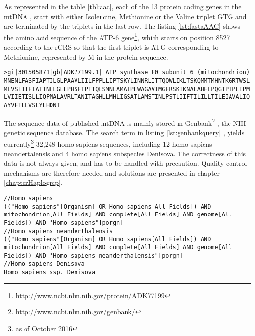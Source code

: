As represented in the table \ref{tbl:aac}, each of the 13 protein coding genes in the mtDNA \cite{Bandelt2006}, start with either Isoleucine, Methionine or the Valine triplet GTG and are terminated by the triplets in the last row. The listing \ref{lst:fastaAAC} shows the amino acid sequence of the ATP-6 gene\footnote{\url{http://www.ncbi.nlm.nih.gov/protein/ADK77199}}, which starts on position 8527 according to the rCRS so that the first triplet is ATG corresponding to Methionine, represented by M in the protein sequence.
{\small 
\begin{lstlisting}[caption= {Example of a FASTA protein sequence - here the complete ATP-6 gene}, label={lst:fastaAAC}]
>gi|301505871|gb|ADK77199.1| ATP synthase F0 subunit 6 (mitochondrion)
MNENLFASFIAPTILGLPAAVLIILFPPLLIPTSKYLINNRLITTQQWLIKLTSKQMMTMHNTKGRTWSL
MLVSLIIFIATTNLLGLLPHSFTPTTQLSMNLAMAIPLWAGAVIMGFRSKIKNALAHFLPQGTPTPLIPM
LVIIETISLLIQPMALAVRLTANITAGHLLMHLIGSATLAMSTINLPSTLIIFTILILLTILEIAVALIQ
AYVFTLLVSLYLHDNT
\end{lstlisting}
}
The sequence data of published mtDNA is mainly stored in Genbank\footnote{\url{http://www.ncbi.nlm.nih.gov/genbank/}} \cite{Benson2005}, the NIH genetic sequence database. The search term in listing \ref{lst:genbankquery} , yields currently\footnote{as of October 2016} 32,248 homo sapiens sequences, including 12 homo sapiens neandertalensis and 4 homo sapiens subspecies Denisova. 
The correctness of this data is not always given, and has to be handled with precaution. Quality control mechanisms are therefore needed and solutions are presented in chapter \ref{chapterHaplogrep}. 
\begin{lstlisting}[caption={GenBank queries for mtDNA sequences}, label={lst:genbankquery}]
//Homo sapiens
(("Homo sapiens"[Organism] OR Homo sapiens[All Fields]) AND mitochondrion[All Fields] AND complete[All Fields] AND genome[All Fields]) AND "Homo sapiens"[porgn]
//Homo sapiens neanderthalensis
(("Homo sapiens"[Organism] OR Homo sapiens[All Fields]) AND mitochondrion[All Fields] AND complete[All Fields] AND genome[All Fields]) AND "Homo sapiens neanderthalensis"[porgn] 
//Homo sapiens Denisova
Homo sapiens ssp. Denisova 
\end{lstlisting}

